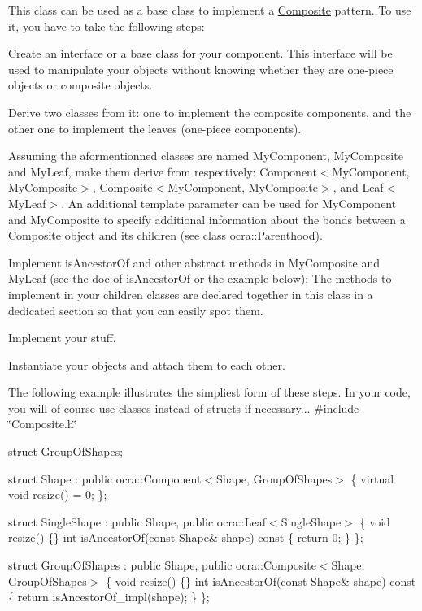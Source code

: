 This class can be used as a base class to implement a \hyperlink{classocra_1_1Composite}{Composite} pattern. To use it, you have to take the following steps\+:
\begin{DoxyEnumerate}
\item Create an interface or a base class for your component. This interface will be used to manipulate your objects without knowing whether they are one-\/piece objects or composite objects.
\item Derive two classes from it\+: one to implement the composite components, and the other one to implement the leaves (one-\/piece components).
\item Assuming the aformentionned classes are named My\+Component, My\+Composite and My\+Leaf, make them derive from respectively\+: Component$<$\+My\+Component, My\+Composite$>$, Composite$<$\+My\+Component, My\+Composite$>$, and Leaf$<$\+My\+Leaf$>$. An additional template parameter can be used for My\+Component and My\+Composite to specify additional information about the bonds between a \hyperlink{classocra_1_1Composite}{Composite} object and its children (see class \hyperlink{classocra_1_1Parenthood}{ocra\+::\+Parenthood}).
\item Implement is\+Ancestor\+Of and other abstract methods in My\+Composite and My\+Leaf (see the doc of is\+Ancestor\+Of or the example below); The methods to implement in your children classes are declared together in this class in a dedicated section so that you can easily spot them.
\item Implement your stuff.
\item Instantiate your objects and attach them to each other.
\end{DoxyEnumerate}

The following example illustrates the simpliest form of these steps. In your code, you will of course use classes instead of structs if necessary...  \#include \char`\"{}\+Composite.\+h\char`\"{}

struct Group\+Of\+Shapes;

struct Shape \+: public ocra\+::\+Component$<$\+Shape, Group\+Of\+Shapes$>$ \{ virtual void resize() = 0; \};

struct Single\+Shape \+: public Shape, public ocra\+::\+Leaf$<$\+Single\+Shape$>$ \{ void resize() \{\} int is\+Ancestor\+Of(const Shape\& shape) const \{ return 0; \} \};

struct Group\+Of\+Shapes \+: public Shape, public ocra\+::\+Composite$<$\+Shape, Group\+Of\+Shapes$>$ \{ void resize() \{\} int is\+Ancestor\+Of(const Shape\& shape) const \{ return is\+Ancestor\+Of\+\_\+impl(shape); \} \};


